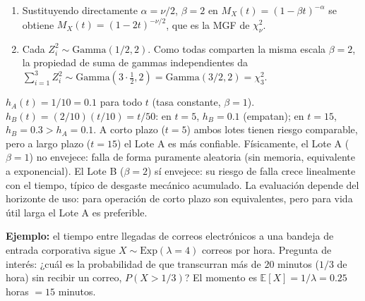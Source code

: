 \begin{solproblema}[prob:6b498ea]
	\begin{enumerate}
		\item Sustituyendo directamente $\alpha=\nu/2$, $\beta=2$ en $M_X(t)=(1-\beta t)^{-\alpha}$ se obtiene $M_X(t) = (1-2t)^{-\nu/2}$, que es la MGF de $\chi^2_\nu$.
		\item Cada $Z_i^2 \sim \text{Gamma}(1/2,2)$. Como todas comparten la misma escala $\beta=2$, la propiedad de suma de gammas independientes da $\sum_{i=1}^3 Z_i^2 \sim \text{Gamma}(3\cdot\tfrac{1}{2},2) = \text{Gamma}(3/2,2) = \chi^2_3$.
	\end{enumerate}
\end{solproblema}

\begin{solproblema}[prob:0f44096]
	$h_A(t) = 1/10 = 0.1$ para todo $t$ (tasa constante, $\beta=1$). $h_B(t) = (2/10)(t/10) = t/50$: en $t=5$, $h_B=0.1$ (empatan); en $t=15$, $h_B=0.3 > h_A=0.1$. A corto plazo ($t=5$) ambos lotes tienen riesgo comparable, pero a largo plazo ($t=15$) el Lote A es más confiable. Físicamente, el Lote A ($\beta=1$) no envejece: falla de forma puramente aleatoria (sin memoria, equivalente a exponencial). El Lote B ($\beta=2$) sí envejece: su riesgo de falla crece linealmente con el tiempo, típico de desgaste mecánico acumulado. La evaluación depende del horizonte de uso: para operación de corto plazo son equivalentes, pero para vida útil larga el Lote A es preferible.
\end{solproblema}

\begin{solproblema}[prob:31a003b]
	\textbf{Ejemplo:} el tiempo entre llegadas de correos electrónicos a una bandeja de entrada corporativa sigue $X \sim \text{Exp}(\lambda=4)$ correos por hora. Pregunta de interés: ¿cuál es la probabilidad de que transcurran más de $20$ minutos ($1/3$ de hora) sin recibir un correo, $P(X > 1/3)$? El momento es $\mathbb{E}[X] = 1/\lambda = 0.25$ horas $= 15$ minutos.
\end{solproblema}
